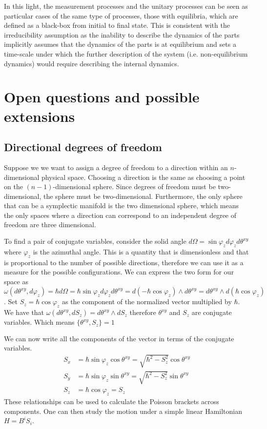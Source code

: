 \documentclass[11pt,letterpaper,fleqn]{memoir} %
\begin{document}
In this light, the measurement processes and the unitary processes can be seen as particular cases of the same type of processes, those with equilibria, which are defined as a black-box from initial to final state. This is consistent with the irreducibility assumption as the inability to describe the dynamics of the parts implicitly assumes that the dynamics of the parts is at equilibrium and sets a time-scale under which the further description of the system (i.e. non-equilibrium dynamics) would require describing the internal dynamics.

\section{Open questions and possible extensions}

\subsection{Directional degrees of freedom}

Suppose we we want to assign a degree of freedom to a direction within an $n$-dimensional physical space. Choosing a direction is the same as choosing a point on the $(n-1)$-dimensional sphere. Since degrees of freedom must be two-dimensional, the sphere must be two-dimensional. Furthermore, the only sphere that can be a symplectic manifold is the two dimensional sphere, which means the only spaces where a direction can correspond to an independent degree of freedom are three dimensional.

To find a pair of conjugate variables, consider the solid angle $d\Omega=\sin \varphi_z d\varphi_z d\theta^{xy}$ where $\varphi_z$ is the azimuthal angle. This is a quantity that is dimensionless and that is proportional to the number of possible directions, therefore we can use it as a measure for the possible configurations. We can express the two form for our space as $\omega(d\theta^{xy}, d\varphi_z) = \hbar d\Omega = \hbar\sin \varphi_z d\varphi_z d\theta^{xy} = d(- \hbar \cos \varphi_z ) \wedge d\theta^{xy} = d\theta^{xy} \wedge d(\hbar \cos \varphi_z )$. Set $S_z= \hbar \cos \varphi_z$ as the component of the normalized vector multiplied by $\hbar$. We have that $\omega(d\theta^{xy}, dS_z) = d\theta^{xy} \wedge dS_z$ therefore $\theta^{xy}$ and $S_z$ are conjugate variables. Which means $\{ \theta^{xy}, S_z \} = 1$

We can now write all the components of the vector in terms of the conjugate variables.
\begin{align*}
S_x &= \hbar \sin \varphi_z \cos \theta^{xy} = \sqrt{\hbar^2 - S_z^2} \cos \theta^{xy}  \\
S_y &= \hbar \sin \varphi_z \sin \theta^{xy} = \sqrt{\hbar^2 - S_z^2} \sin \theta^{xy}\\
S_z &= \hbar \cos \varphi_z = S_z
\end{align*}
These relationships can be used to calculate the Poisson brackets across components. One can then study the motion under a simple linear Hamiltonian $H = B^i S_i$.
\end{document}

